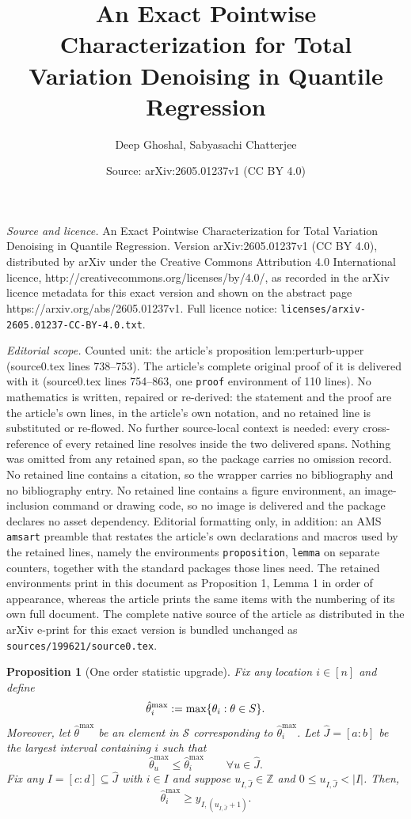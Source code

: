 \documentclass[10pt,a4paper]{amsart}
\title{An Exact Pointwise Characterization for Total Variation Denoising in Quantile Regression}
\author{Deep Ghoshal, Sabyasachi Chatterjee}
\date{Source: arXiv:2605.01237v1 (CC BY 4.0)}
\newtheorem{proposition}{Proposition}
\newcommand{\cS}{\mathcal{S}}
\begin{document}
\maketitle

\noindent\emph{Source and licence.} An Exact Pointwise Characterization for Total Variation Denoising in Quantile Regression. Version arXiv:2605.01237v1 (CC BY 4.0), distributed by arXiv under the Creative Commons Attribution 4.0 International licence, http://creativecommons.org/licenses/by/4.0/, as recorded in the arXiv licence metadata for this exact version and shown on the abstract page https://arxiv.org/abs/2605.01237v1. Full licence notice: \texttt{licenses/arxiv-2605.01237-CC-BY-4.0.txt}.\par\smallskip

\noindent\textit{Editorial scope.} Counted unit: the article's proposition lem:perturb-upper (source0.tex lines 738--753). The article's complete original proof of it is delivered with it (source0.tex lines 754--863, one \texttt{proof} environment of 110 lines). No mathematics is written, repaired or re-derived: the statement and the proof are the article's own lines, in the article's own notation, and no retained line is substituted or re-flowed.  No further source-local context is needed: every cross-reference of every retained line resolves inside the two delivered spans.  Nothing was omitted from any retained span, so the package carries no omission record.  No retained line contains a citation, so the wrapper carries no bibliography and no bibliography entry.  No retained line contains a figure environment, an image-inclusion command or drawing code, so no image is delivered and the package declares no asset dependency.  Editorial formatting only, in addition: an AMS \texttt{amsart} preamble that restates the article's own declarations and macros used by the retained lines, namely the environments \texttt{proposition}, \texttt{lemma} on separate counters, together with the standard packages those lines need.  The retained environments print in this document as Proposition 1, Lemma 1 in order of appearance, whereas the article prints the same items with the numbering of its own full document.  The complete native source of the article as distributed in the arXiv e-print for this exact version is bundled unchanged as \texttt{sources/199621/source0.tex}.
\begin{proposition}[One order statistic upgrade]\label{lem:perturb-upper}
 Fix any location $i \in [n]$ and define
    \[\hat\theta_i^{\max}:=\max\{\theta_i:\theta\in\mathcal \cS\}.\]
    Moreover, let $\hat{\theta}^{\max}$ be an element in $\cS$ corresponding to $\hat{\theta}^{\max}_i$.
Let $\hat{J}=[a:b]$ be the largest interval containing $i$ such that
\[
\hat\theta^{\max}_u \le \hat\theta^{\max}_i
\qquad \forall u\in \hat J.
\]
Fix any $I=[c:d]\subseteq \hat J$ with $i\in I$ and suppose
$u_{I,\hat J}\in\mathbb Z$ and $0\le u_{I,\hat J}<|I|$.
Then,
\[
\hat\theta_i^{\max}\ge y_{I,(u_{I,\hat J}+1)}.
\]
\end{proposition}
\end{document}

